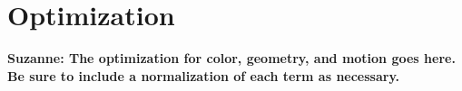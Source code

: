 \section{Optimization}
{\bf{Suzanne:  The optimization for color, geometry, and motion goes 
here.  Be sure to include a normalization of each term as necessary.}}
